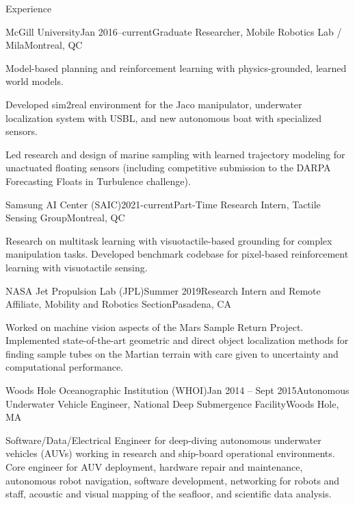 \documentclass{resume} %
\begin{document}
\begin{rSection}{Experience}
\begin{rSubsection}{McGill University}{Jan 2016--current}{Graduate Researcher, Mobile Robotics Lab / Mila}{Montreal, QC}
\item{Model-based planning and reinforcement learning with physics-grounded, learned world models. }
\item{Developed sim2real environment for the Jaco manipulator, underwater localization system with USBL, and new autonomous boat with specialized sensors.}
\item{Led research and design of marine sampling with learned trajectory modeling for unactuated floating sensors (including competitive submission to the DARPA Forecasting Floats in Turbulence challenge). } 
\end{rSubsection}
\vspace{-.2cm}
	\begin{rSubsection}{Samsung AI Center (SAIC)}{2021-current}{Part-Time Research Intern, Tactile Sensing Group}{Montreal, QC}
\item{Research on multitask learning with visuotactile-based grounding for complex manipulation tasks. Developed benchmark codebase for pixel-based reinforcement learning with visuotactile sensing.}
\end{rSubsection}
\vspace{-.2cm}
\begin{rSubsection}{NASA Jet Propulsion Lab (JPL)}{Summer 2019}{Research Intern and Remote Affiliate, Mobility and Robotics Section}{Pasadena, CA}
\item{Worked on machine vision aspects of the Mars Sample Return Project. Implemented state-of-the-art geometric and direct object localization methods for finding sample tubes on the Martian terrain with care given to uncertainty and computational performance. }
\end{rSubsection}
	\vspace{-.2cm}
\begin{rSubsection}{Woods Hole Oceanographic Institution (WHOI)}{Jan 2014 -- Sept 2015}{Autonomous Underwater Vehicle Engineer, National Deep Submergence Facility}{Woods Hole, MA}
\item{Software/Data/Electrical Engineer for deep-diving autonomous underwater vehicles (AUVs) working in research and ship-board operational environments. Core engineer for AUV deployment, hardware repair and maintenance, autonomous robot navigation, software development, networking for robots and staff, acoustic and visual mapping of the seafloor, and scientific data analysis.}

\end{rSubsection}
\end{rSection}
\end{document}
